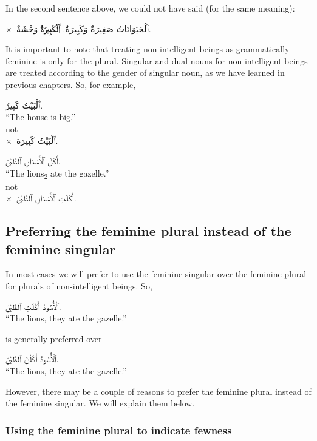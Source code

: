\documentclass[
  10pt,
]{book}
\begin{document}
In the second sentence above, we could not have said (for the same meaning):

\(\times\)~\foreignlanguage{arabic}{ٱَلْحَيَوَانَاتُ صَغِيرَةٌ وَکَبِيرَةٌ. \textbf{ٱَلْكَبِيرَةُ} وَحْشَةٌ.}

It is important to note that treating non-intelligent beings as grammatically feminine is only for the plural. Singular and dual nouns for non-intelligent beings are treated according to the gender of singular noun, as we have learned in previous chapters. So, for example,

\foreignlanguage{arabic}{ٱَلْبَيْتُ کَبِيرٌ.}\\
\enquote{The house is big.}\\
not\\
\(\times\)~\foreignlanguage{arabic}{ٱَلْبَيْتُ کَبِيرَة.}

\foreignlanguage{arabic}{أَکَلَ ٱلْأَسَدَانِ ٱلظَّبْيَ.}\\
\enquote{The lions\textsubscript{2} ate the gazelle.}\\
not\\
\(\times\)~\foreignlanguage{arabic}{أَکَلَتِ ٱلْأَسَدَانِ ٱلظَّبْيَ.}

\subsection{Preferring the feminine plural instead of the feminine singular}\label{preferring-the-feminine-plural-instead-of-the-feminine-singular}

In most cases we will prefer to use the feminine singular over the feminine plural for plurals of non-intelligent beings. So,

\foreignlanguage{arabic}{ٱلْأُسُودُ أَکَلَتِ ٱلظَّبْيَ.}\\
\enquote{The lions, they ate the gazelle.}

is generally preferred over

\foreignlanguage{arabic}{ٱلْأُسُودُ أَکَلْنَ ٱلظَّبْيَ.}\\
\enquote{The lions, they ate the gazelle.}

However, there may be a couple of reasons to prefer the feminine plural instead of the feminine singular. We will explain them below.

\subsubsection{Using the feminine plural to indicate fewness}\label{using-the-feminine-plural-to-indicate-fewness}
\end{document}
